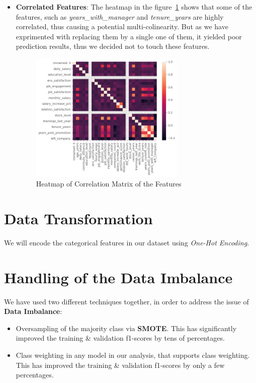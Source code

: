 \documentclass[a4paper,12pt]{article}
\begin{document}
\begin{itemize}
    \item \textbf{Correlated Features}: The heatmap in the figure~\ref{fig:fig_3} shows that some of the features, such as \textit{years\_with\_manager} and \textit{tenure\_years} are highly correlated, 
    thus causing a potential multi-colinearity. But as we have exprimented with replacing them by a single one of them, it yielded poor prediction results, thus we decided not to touch these features.
    \begin{figure}[H]
    \centering
    \includegraphics[width=0.7\textwidth]{./images/feature_corr.png}
    \caption{Heatmap of Correlation Matrix of the Features}
    \label{fig:fig_3}
    \end{figure}
\end{itemize}


\section{Data Transformation}
We will encode the categorical features in our dataset using \textit{One-Hot Encoding}.


\section{Handling of the Data Imbalance}
We have used two different techniques together, in order to address the issue of \textbf{Data Imbalance}:
\begin{itemize}
    \item Oversampling of the majority class via \textbf{SMOTE}. This has significantly improved the training \& validation f1-scores by tens of percentages.
    \item Class weighting in any model in our analysis, that supports class weighting. This has improved the training \& validation f1-scores by only a few percentages.
\end{itemize}
\end{document}
